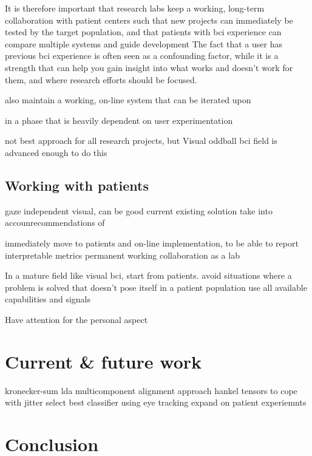 It is therefore important that research labs keep a working, long-term collaboration with
patient centers such that new projects can immediately be tested by the target
population, and that patients with bci experience can compare multiple systems
and guide development
The fact that a user has previous bci experience is often seen as a confounding
factor, while it is a strength that can help you gain insight into what works
and doesn't work for them, and where research efforts should be focused.

also maintain a working, on-line system that can be iterated upon

in a phase that is heavily dependent on user experimentation

not best approach for all research projects, but
Visual oddball bci field is advanced enough to do this


\subsection{Working with patients}
gaze independent visual, can be good current existing solution
take into accounrecommendations of \textcite{FriedOken2020}

immediately move to patients and on-line implementation, to be able to report
interpretable metrics
permanent working collaboration as a lab

In a mature field like visual bci, start from patients.
avoid situations where a problem is solved that doesn't pose itself in a
patient population
use all available capabilities and signals

Have attention for the personal aspect


\section{Current \& future work}
kronecker-sum lda
multicomponent alignment approach
hankel tensors to cope with jitter
select best classifier using eye tracking
expand on patient experiemnts

\section{Conclusion}
